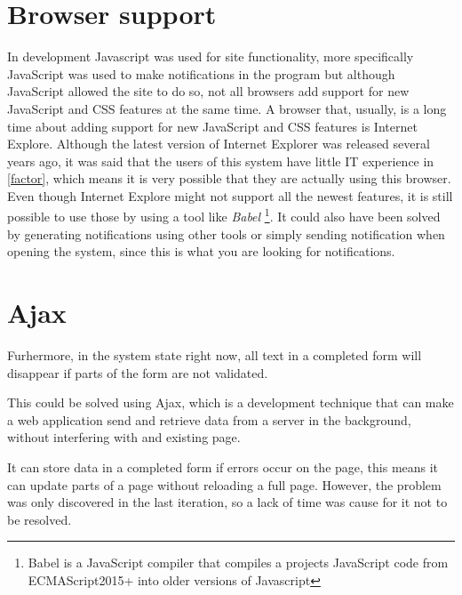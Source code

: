 \section{Browser support}
In development Javascript was used for site functionality, more specifically JavaScript was used to make notifications in the program but although JavaScript allowed the site to do so, not all browsers add support for new JavaScript and CSS features at the same time.
A browser that, usually, is a long time about adding support for new JavaScript and CSS features is Internet Explore.
Although the latest version of Internet Explorer was released several years ago, it was said that the users of this system have little IT experience in \cref{factor}, which means it is very possible that they are actually using this browser.
Even though Internet Explore might not support all the newest features, it is still possible to use those by using a tool like \textit{Babel} \footnote{Babel is a JavaScript compiler that compiles a projects JavaScript code from ECMAScript2015+ into older versions of Javascript}.
It could also have been solved by generating notifications using other tools or simply sending notification when opening the system, since this is what you are looking for notifications.

\section{Ajax}

Furhermore, in the system state right now, all text in a completed form will disappear if parts of the form are not validated.

This could be solved using Ajax, which is a development technique that can make a web application send and retrieve data from a server in the background, without interfering with and existing page.

It can store data in a completed form if errors occur on the page, this means it can update parts of a page without reloading a full page.
However, the problem was only discovered in the last iteration, so a lack of time was cause for it not to be resolved.
